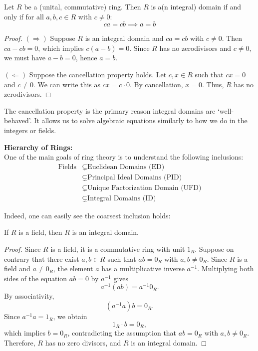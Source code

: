 \begin{proposition}
Let $R$ be a (unital, commutative) ring. Then $R$ is a(n integral) domain if and only if for all $a, b, c \in R$ with $c \neq 0$:
\[ ca = cb \implies a = b \]
\end{proposition}

\begin{proof}
$(\Rightarrow)$ Suppose $R$ is an integral domain and $ca = cb$ with $c \neq 0$. Then $ca - cb = 0$, which implies $c(a - b) = 0$. Since $R$ has no zerodivisors and $c \neq 0$, we must have $a - b = 0$, hence $a = b$.

$(\Leftarrow)$ Suppose the cancellation property holds. Let $c, x \in R$ such that $cx = 0$ and $c \neq 0$. We can write this as $cx = c \cdot 0$. By cancellation, $x = 0$. Thus, $R$ has no zerodivisors.
\end{proof}

\begin{remark}
The cancellation property is the primary reason integral domains are `well-behaved'. It allows us to solve algebraic equations similarly to how we do in the integers or fields.
\end{remark}

\noindent\textbf{Hierarchy of Rings:} \\
One of the main goals of ring theory is to understand the following inclusions:
\begin{align*} \text{Fields} &\subsetneq \text{Euclidean Domains (ED)}\\ &\subsetneq \text{Principal Ideal Domains (PID)} \\ &\subsetneq \text{Unique Factorization Domain (UFD)} \\ &\subsetneq \text{Integral Domains (ID)} \end{align*}

Indeed, one can easily see the coarsest inclusion holds:
\begin{proposition}
If $R$ is a field, then $R$ is an integral domain.
\end{proposition}

\begin{proof}
Since $R$ is a field, it is a commutative ring with unit $1_R$. Suppose on contrary that there exist $a,b \in R$ such that $ab = 0_R$ with $a, b \neq 0_R$. Since $R$ is a field and $a \neq 0_R$, the element $a$ has a multiplicative inverse $a^{-1}$. Multiplying both sides of the equation $ab = 0$ by $a^{-1}$ gives
\[
a^{-1}(ab) = a^{-1}0_R.
\]
By associativity,
\[
(a^{-1}a)b = 0_R.
\]
Since $a^{-1}a = 1_R$, we obtain
\[
1_R \cdot b = 0_R,
\]
which implies $b = 0_R$, contradicting the assumption that $ab = 0_R$ with $a, b \neq 0_R$. Therefore, $R$ has no zero divisors, and $R$ is an integral domain.
\end{proof}

